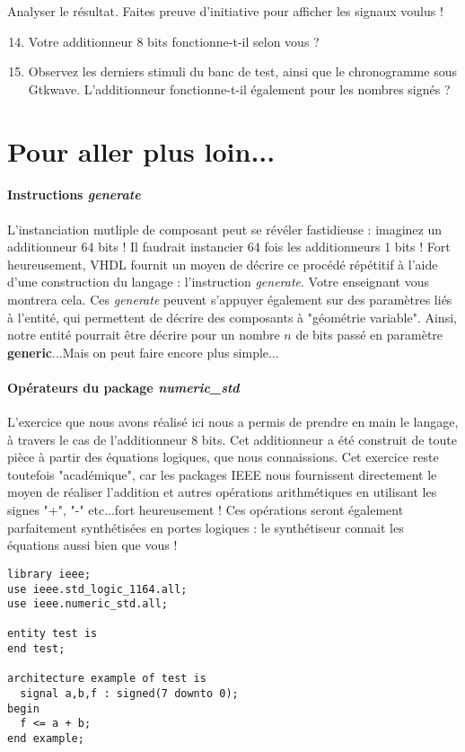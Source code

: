 \documentclass[a4paper,11pt]{article}
\begin{document}
Analyser le résultat. Faites preuve d'initiative pour afficher les signaux voulus !

\begin{enumerate}
  \setcounter{enumi}{13}
  \item Votre additionneur 8 bits fonctionne-t-il selon vous ?
  \item Observez les derniers stimuli du banc de test, ainsi que le chronogramme sous Gtkwave. L'additionneur fonctionne-t-il également pour les
  nombres signés ?
\end{enumerate}

\section{Pour aller plus loin...}

\paragraph{Instructions {\it generate}}
L'instanciation mutliple de composant peut se révéler fastidieuse : imaginez un additionneur 64 bits ! Il faudrait instancier 64 fois les additionneurs 1 bits !
Fort heureusement, VHDL fournit un moyen de décrire ce procédé répétitif à l'aide d'une construction du langage : l'instruction {\it generate}. Votre enseignant vous montrera cela.
Ces {\it generate} peuvent s'appuyer également sur des paramètres liés à l'entité, qui permettent de décrire des composants à "géométrie variable". Ainsi, notre
entité pourrait être décrire pour un nombre $n$ de bits passé en paramètre \textbf{generic}...Mais on peut faire encore plus simple...

\paragraph{Opérateurs du package {\it numeric\_std}}
L'exercice que nous avons réalisé ici nous a permis de prendre en main le langage, à travers le cas de l'additionneur 8 bits. Cet additionneur
a été construit de toute pièce à partir des équations logiques, que nous connaissions. Cet exercice reste toutefois "académique", car les
packages IEEE nous fournissent directement le moyen de réaliser l'addition et autres opérations arithmétiques en utilisant les signes "+", "-" etc...fort heureusement !
Ces opérations seront également parfaitement synthétisées en portes logiques : le synthétiseur connait les équations aussi bien que vous !

\begin{lstlisting}
library ieee;
use ieee.std_logic_1164.all;
use ieee.numeric_std.all;

entity test is
end test;

architecture example of test is
  signal a,b,f : signed(7 downto 0);
begin
  f <= a + b;
end example;
\end{lstlisting}
\end{document}
